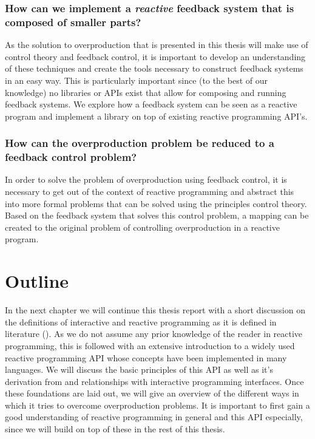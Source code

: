 \subsubsection{How can we implement a \emph{reactive} feedback system that is composed of smaller parts?} 
As the solution to overproduction that is presented in this thesis will make use of control theory and feedback control, it is important to develop an understanding of these techniques and create the tools necessary to construct feedback systems in an easy way. This is particularly important since (to the best of our knowledge) no libraries or APIs exist that allow for composing and running feedback systems. We explore how a feedback system can be seen as a reactive program and implement a library on top of existing reactive programming API's.

\subsubsection{How can the overproduction problem be reduced to a feedback control problem?}
In order to solve the problem of overproduction using feedback control, it is necessary to get out of the context of reactive programming and abstract this into more formal problems that can be solved using the principles control theory. Based on the feedback system that solves this control problem, a mapping can be created to the original problem of controlling overproduction in a reactive program.


\section{Outline}
In the next chapter we will continue this thesis report with a short discussion on the definitions of interactive and reactive programming as it is defined in literature (). As we do not assume any prior knowledge of the reader in reactive programming, this is followed with an extensive introduction to a widely used reactive programming API whose concepts have been implemented in many languages. We will discuss the basic principles of this API as well as it's derivation from and relationships with interactive programming interfaces. Once these foundations are laid out, we will give an overview of the different ways in which it tries to overcome overproduction problems. It is important to first gain a good understanding of reactive programming in general and this API especially, since we will build on top of these in the rest of this thesis.

